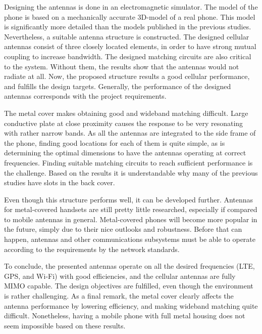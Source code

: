 Designing the antennas is done in an electromagnetic simulator. The model of the phone is based on a mechanically accurate 3D-model of a real phone. This model is significantly more detailed than the models published in the previous studies. Nevertheless, a suitable antenna structure is constructed. The designed cellular antennas consist of three closely located elements, in order to have strong mutual coupling to increase bandwidth. The designed matching circuits are also critical to the system. Without them, the results show that the antennas would not radiate at all. Now, the proposed structure results a good cellular performance, and fulfills the design targets. Generally, the performance of the designed antennas corresponds with the project requirements.

The metal cover makes obtaining good and wideband matching difficult. Large conductive plate at close proximity causes the response to be very resonating with rather narrow bands. As all the antennas are integrated to the side frame of the phone, finding good locations for each of them is quite simple, as is determining the optimal dimensions to have the antennas operating at correct frequencies. Finding suitable matching circuits to reach sufficient performance is the challenge. Based on the results it is understandable why many of the previous studies have slots in the back cover.

Even though this structure performs well, it can be developed further. Antennas for metal-covered handsets are still pretty little researched, especially if compared to mobile antennas in general. Metal-covered phones will become more popular in the future, simply due to their nice outlooks and robustness. Before that can happen, antennas and other communications subsystems must be able to operate according to the requirements by the network standards.

To conclude, the presented antennas operate on all the desired frequencies (LTE, GPS, and Wi-Fi) with good efficiencies, and the cellular antennas are fully MIMO capable. The design objectives are fulfilled, even though the environment is rather challenging. As a final remark, the metal cover clearly affects the antenna performance by lowering efficiency, and making wideband matching quite difficult. Nonetheless, having a mobile phone with full metal housing does not seem impossible based on these results.


\clearpage
